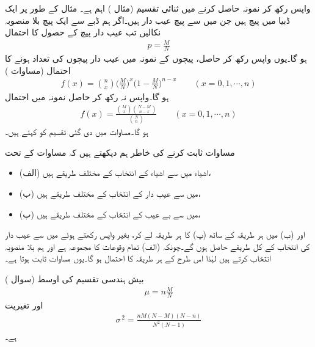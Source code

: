 واپس رکھ کر نمونہ حاصل کرنے میں ثنائی تقسیم (مثال ) اہم ہے۔ مثال کے طور پر ایک ڈبیا میں  پیچ ہیں جن میں سے  پیچ عیب دار ہیں۔اگر ہم ڈبے سے ایک پیچ بلا منصوبہ نکالیں تب عیب دار پیچ کے حصول کا احتمال
\begin{align*}
p=\frac{M}{N}
\end{align*}
ہو گا۔یوں واپس رکھ کر حاصل،  پیچوں کے نمونہ میں عیب دار پیچوں کی تعداد  ہونے کا احتمال (مساوات )
\begin{align}\label{مساوات_شماریات_واپس_رکھ_کر_نمونہ}
f(x)=\binom{n}{x}\big(\frac{M}{N}\big)^x\big(1-\frac{M}{N}\big)^{n-x}\quad\quad (x=0,1,\cdots,n)
\end{align}
ہو گا۔واپس نہ رکھ کر حاصل نمونہ میں احتمال 
\begin{align}\label{مساوات_شماریات_بیش_ہندسی_تقسیم}
f(x)=\frac{\binom{M}{x}\binom{N-M}{n-x}}{\binom{N}{n}}\quad\quad (x=0,1,\cdots,n)
\end{align}
ہو گا۔مساوات  میں دی گئی تقسیم کو  کہتے ہیں۔

مساوات  ثابت کرنے کی خاطر ہم دیکھتے ہیں کہ مساوات  کے تحت 
\begin{itemize}
\item{(الف)}
 اشیاء میں سے  اشیاء کے انتخاب کے  مختلف طریقے ہیں،
\item{(ب)}
 میں سے  عیب دار کے انتخاب کے  مختلف طریقے ہیں،
\item{(پ)}
 میں سے  بے عیب کے انتخاب کے  مختلف طریقے ہیں،
\end{itemize}
اور (ب) میں ہر طریقہ کے ساتھ (پ) کا ہر طریقہ لے  کر، بغیر واپس رکھتے ہوئے  میں سے  عیب دار کی انتخاب کے کل طریقے حاصل ہوں گے۔چونکہ (الف) تمام وقوعات کا مجموعہ ہے اور ہم بلا منصوبہ انتخاب کرتے ہیں لہٰذا اس طرح کے ہر طریقہ کا احتمال  ہو گا۔یوں مساوات  ثابت ہوتا ہے۔

بیش ہندسی تقسیم کی اوسط (سوال )
\begin{align}\label{مساوات_شماریات_اوسط_بیش_ہندسی_الف}
\mu=n\frac{M}{N}
\end{align}
اور تغیریت
\begin{align}
\sigma^{\,2}=\frac{nM(N-M)(N-n)}{N^2(N-1)}
\end{align}
ہے۔

